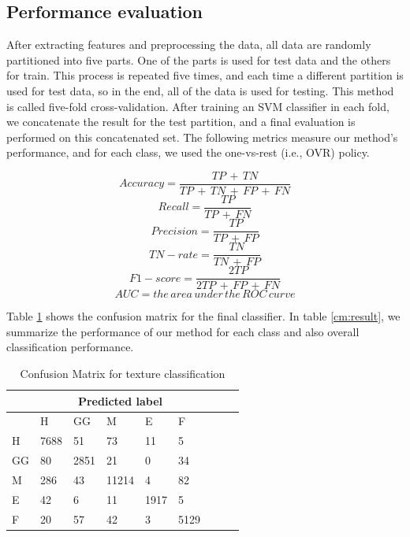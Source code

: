 \documentclass[conference]{IEEEtran}
\begin{document}
\subsection{\textbf{Performance evaluation}}
After extracting features and preprocessing the data, all data are randomly partitioned into five parts. One of the parts is used for test data and the others for train. This process is repeated five times, and each time a different partition is used for test data, so in the end, all of the data is used for testing. This method is called five-fold cross-validation. After training an SVM classifier in each fold, we concatenate the result for the test partition, and a final evaluation is performed on this concatenated set. The following metrics measure our method's performance, and for each class, we used the one-vs-rest (i.e., OVR) policy.


\small \begin{equation}
Accuracy = \frac{TP\,+\,TN}{TP\,+\,TN\,+\,FP\,+\,FN} \nonumber
\end{equation}
\small \begin{equation}
Recall = \frac{TP}{TP\,+\,FN} \nonumber
\end{equation}
\small \begin{equation}
Precision = \frac{TP}{TP\,+\,FP} \nonumber
\end{equation}
\small \begin{equation}
TN-rate = \frac{TN}{TN\,+\,FP} \nonumber
\end{equation}
\small \begin{equation}
F1-score = \frac{2TP}{2TP\,+\,FP\,+\,FN}\nonumber
\end{equation}
\small \begin{equation}
AUC = the\,area\,under\, the\, ROC\, curve  \nonumber
\end{equation}

Table \ref{cm:CM} shows the confusion matrix for the final classifier. In table \ref{cm:result}, we summarize the performance of our method for each class and also overall classification performance.



\begin{table}[tbh]
\caption{Confusion Matrix for texture classification}
\label{cm:CM}
\small
\centering
\begin{tabular}{@{}lllllllll@{}}
&& \multicolumn{3}{c}{Predicted label}\\
\toprule
 & H & GG & M & E & F \\ \midrule
 
H& 7688 & 51 & 73 & 11 & 5 \\ 
GG& 80 & 2851 & 21 & 0 & 34 \\ 
M& 286 & 43 & 11214 & 4 & 82 \\ 
E& 42 & 6 & 11 & 1917 & 5 \\ 
F& 20 & 57 & 42 & 3 & 5129 \\ \bottomrule

\end{tabular}
\end{table}
\end{document}
